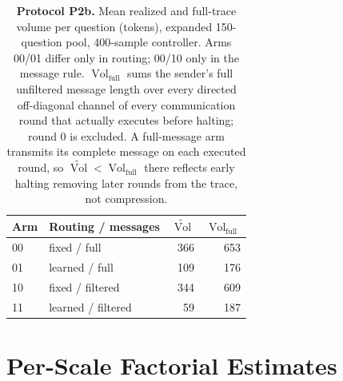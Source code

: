 \documentclass[11pt]{article}
\newcommand{\Vol}{\operatorname{Vol}}
\newcommand{\Volt}{\widetilde{\Vol}}
\begin{document}
\begin{table}[H]
\centering
\small
\setlength{\tabcolsep}{5pt}
\begin{tabular}{llrr}
\toprule
Arm & Routing / messages & $\Volt$ & $\Vol_{\mathrm{full}}$ \\
\midrule
00 & fixed / full        & 366 & 653 \\
01 & learned / full      & 109 & 176 \\
10 & fixed / filtered    & 344 & 609 \\
11 & learned / filtered  & \phantom{0}59 & 187 \\
\bottomrule
\end{tabular}
\caption{\textbf{Protocol P2b.} Mean realized and full-trace volume per question
(tokens), expanded 150-question pool, 400-sample controller. Arms 00/01 differ
only in routing; 00/10 only in the message rule. $\Vol_{\mathrm{full}}$ sums the sender's full unfiltered
message length over every directed off-diagonal channel of every communication
round that actually executes before halting; round 0 is excluded. A full-message
arm transmits its complete message on each executed round, so
$\Volt<\Vol_{\mathrm{full}}$ there reflects early halting removing later
rounds from the trace, not compression. }
\label{tab:volume}
\end{table}

\section{Per-Scale Factorial Estimates}
\label{app:per-scale-ols}
\end{document}
